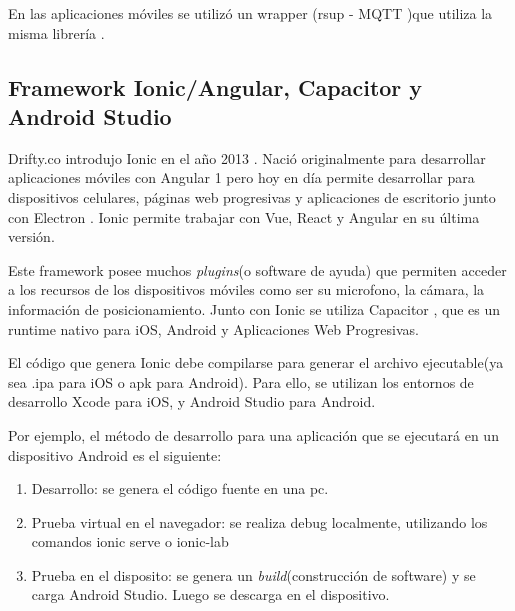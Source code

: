 En las aplicaciones móviles se utilizó un wrapper (rsup - MQTT )que utiliza la misma librería \citep{WEBSITE:27}.


\subsection{Framework Ionic/Angular, Capacitor y Android Studio}
\label{subsec: Ionic}

Drifty.co introdujo Ionic en el año 2013 \citep{WEBSITE:24}. Nació originalmente para desarrollar aplicaciones móviles con Angular 1 pero hoy en día permite desarrollar para dispositivos celulares, páginas web progresivas y aplicaciones de escritorio junto con Electron \citep{WEBSITE:25}. Ionic permite trabajar con Vue, React y Angular en su última versión.

Este framework posee muchos \textit{plugins}(o software de ayuda) que permiten acceder a los recursos de los dispositivos móviles como ser su microfono, la cámara, la información de posicionamiento. Junto con Ionic se utiliza Capacitor \citep{WEBSITE:26}, que es un runtime nativo para iOS, Android y Aplicaciones Web Progresivas.

El código que genera Ionic debe compilarse para generar el archivo ejecutable(ya sea .ipa para iOS o apk para Android). Para ello, se utilizan los entornos de desarrollo Xcode para iOS, y Android Studio para Android.

Por ejemplo, el método de desarrollo para una aplicación que se ejecutará en un dispositivo Android es el siguiente:

\begin{enumerate}
\item Desarrollo: se genera el código fuente en una pc.
\item Prueba virtual en el navegador:  se realiza debug localmente, utilizando los comandos ionic serve o ionic-lab
\item Prueba en el disposito: se genera un \textit{build}(construcción de software) y se carga Android Studio. Luego se descarga en el dispositivo.
\end{enumerate}
